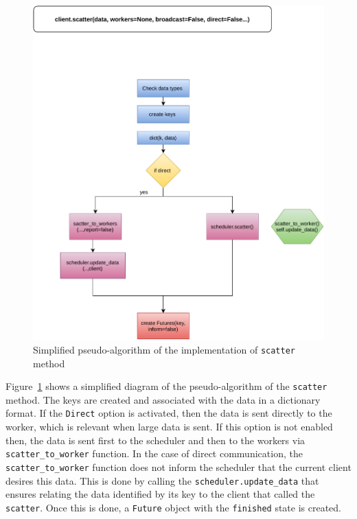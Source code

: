 \begin{figure}\centering
\includegraphics[scale=0.65]{figures/scatter.pdf}
\caption{Simplified pseudo-algorithm of the \dask implementation of \texttt{scatter} method}
\label{figoldscatter}
\end{figure}

Figure~\ref{figoldscatter} shows a simplified diagram of the pseudo-algorithm of the \texttt{scatter} method. The keys are created and associated with the data in a dictionary format. If the \texttt{Direct} option is activated, then the data is sent directly to the worker, which is relevant when large data is sent. If this option is not enabled then, the data is sent first to the scheduler and then to the workers via \texttt{scatter\_to\_worker} function. In the case of direct communication, the \texttt{scatter\_to\_worker} function does not inform the scheduler that the current client desires this data. This is done by calling the \texttt{scheduler.update\_data} that ensures relating the data identified by its key to the client that called the \texttt{scatter}. Once this is done, a \texttt{Future} object with the \texttt{finished} state is created. 


